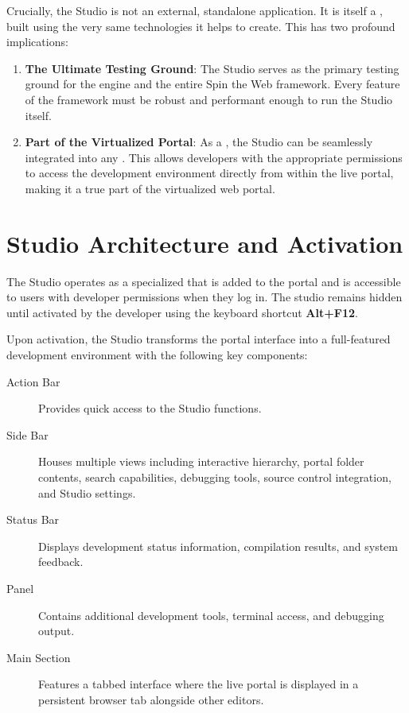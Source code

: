 Crucially, the Studio is not an external, standalone application. It is itself a \textbf{\webbaselet{}}, built using the very same technologies it helps to create. This has two profound implications:

\begin{enumerate}
    \item \textbf{The Ultimate Testing Ground}: The Studio serves as the primary testing ground for the \webspinner{} engine and the entire Spin the Web framework. Every feature of the framework must be robust and performant enough to run the Studio itself.
    \item \textbf{Part of the Virtualized Portal}: As a \webbaselet{}, the Studio can be seamlessly integrated into any \webbase{}. This allows developers with the appropriate permissions to access the development environment directly from within the live portal, making it a true part of the virtualized web portal.
\end{enumerate}

\section{Studio Architecture and Activation}
\label{sec:studio-architecture}

The Studio operates as a specialized \webbaselet{} that is added to the portal \webbase{} and is accessible to users with developer permissions when they log in. The studio remains hidden until activated by the developer using the keyboard shortcut \textbf{Alt+F12}.

Upon activation, the Studio transforms the portal interface into a full-featured development environment with the following key components:

\begin{description}
    \item[Action Bar] Provides quick access to the Studio functions.
    \item[Side Bar] Houses multiple views including interactive \webbase{} hierarchy, portal folder contents, search capabilities, debugging tools, source control integration, and Studio settings.
    \item[Status Bar] Displays development status information, compilation results, and system feedback.
    \item[Panel] Contains additional development tools, terminal access, and debugging output.
    \item[Main Section] Features a tabbed interface where the live portal is displayed in a persistent browser tab alongside other editors.
\end{description}

